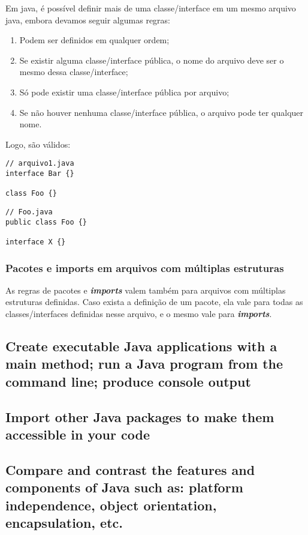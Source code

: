 \documentclass[12pt]{article}
\begin{document}
Em java, é possível definir mais de uma classe/interface em um mesmo arquivo java, embora devamos seguir algumas regras:

\begin{enumerate}
	\item Podem ser definidos em qualquer ordem;
	\item Se existir alguma classe/interface pública, o nome do arquivo deve ser o mesmo dessa classe/interface;
	\item Só pode existir uma classe/interface pública por arquivo;
	\item Se não houver nenhuma classe/interface pública, o arquivo pode ter qualquer nome.
\end{enumerate}

Logo, são válidos:

\begin{lstlisting}
// arquivo1.java
interface Bar {}

class Foo {}
\end{lstlisting}


\begin{lstlisting}
// Foo.java
public class Foo {}

interface X {}
\end{lstlisting}

\subsubsection{Pacotes e imports em arquivos com múltiplas estruturas}

As regras de pacotes e \textbf{\textit{imports}} valem também para arquivos com múltiplas estruturas definidas. Caso exista a definição de um pacote, ela vale para todas as classes/interfaces definidas nesse arquivo, e o mesmo vale para \textbf{\textit{imports}}.

\subsection*{Create executable Java applications with a main method; run a Java program from the command line; produce console output}





\newpage

\subsection*{Import other Java packages to make them accessible in your code}
\subsection*{Compare and contrast the features and components of Java such as: platform independence, object orientation, encapsulation, etc.}

	
\end{document}
